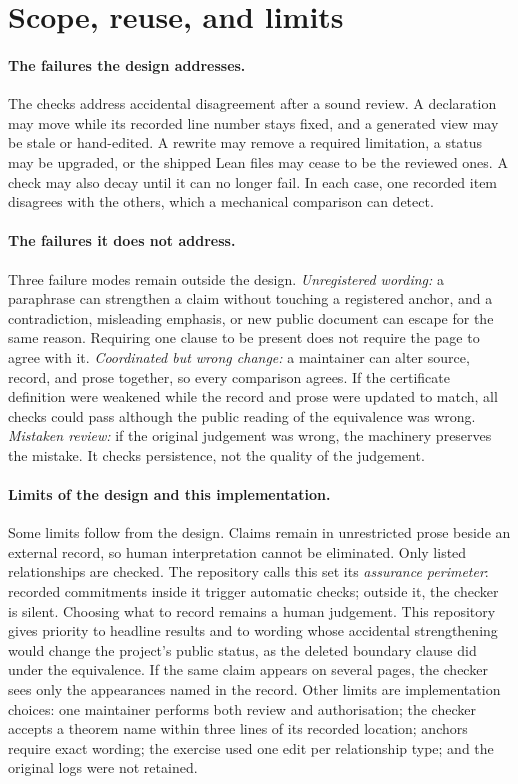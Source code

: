 \documentclass[11pt]{article}
\begin{document}
\section{Scope, reuse, and limits}\label{sec:limits}

\paragraph{The failures the design addresses.}
The checks address accidental disagreement after a sound review.  A declaration
may move while its recorded line number stays fixed, and a generated view may
be stale or hand-edited.  A rewrite may remove a required limitation, a status
may be upgraded, or the shipped Lean files may cease to be the reviewed ones.
A check may also decay until it can no longer fail.  In each case, one
recorded item disagrees with the others, which a mechanical comparison can
detect.

\paragraph{The failures it does not address.}
Three failure modes remain outside the design.  \emph{Unregistered wording:}
a paraphrase can strengthen a claim without touching a registered anchor, and
a contradiction, misleading emphasis, or new public document can escape for
the same reason.  Requiring one clause to be present does not require the page
to agree with it.  \emph{Coordinated but wrong change:} a maintainer can alter
source, record, and prose together, so every comparison agrees.  If the
certificate definition were weakened while the record and prose were updated
to match, all checks could pass although the public reading of the equivalence
was wrong.  \emph{Mistaken review:} if the original judgement was wrong, the
machinery preserves the mistake.  It checks persistence, not the quality of
the judgement.

\paragraph{Limits of the design and this implementation.}
Some limits follow from the design.  Claims remain in unrestricted prose beside
an external record, so human interpretation cannot be eliminated.  Only listed
relationships are checked.  The repository calls this set its \emph{assurance
perimeter}: recorded commitments inside it trigger automatic checks; outside it,
the checker is silent.  Choosing what to record remains a human judgement.
This repository gives priority to headline results and to wording whose
accidental strengthening would change the project's public status, as the
deleted boundary clause did under the equivalence.  If the same claim appears
on several pages, the checker sees only the appearances named in the record.
Other limits are implementation choices: one maintainer performs both review
and authorisation; the checker accepts a theorem name within three lines of its
recorded location; anchors require exact wording; the exercise used one edit
per relationship type; and the original logs were not retained.
\end{document}
